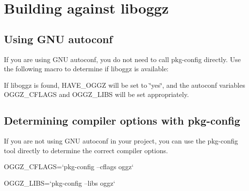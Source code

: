 \section{\-Building against liboggz}
\label{group__building}
\subsection{\-Using G\-N\-U autoconf}\label{group__building_autoconf}
\-If you are using \-G\-N\-U autoconf, you do not need to call pkg-\/config directly. \-Use the following macro to determine if liboggz is available\-:




\-If liboggz is found, \-H\-A\-V\-E\-\_\-\-O\-G\-G\-Z will be set to \char`\"{}yes\char`\"{}, and the autoconf variables \-O\-G\-G\-Z\-\_\-\-C\-F\-L\-A\-G\-S and \-O\-G\-G\-Z\-\_\-\-L\-I\-B\-S will be set appropriately.\subsection{\-Determining compiler options with pkg-\/config}\label{group__building_pkg-config}
\-If you are not using \-G\-N\-U autoconf in your project, you can use the pkg-\/config tool directly to determine the correct compiler options.


\begin{DoxyPre}
 OGGZ\_CFLAGS=`pkg-config --cflags oggz`\end{DoxyPre}



\begin{DoxyPre} OGGZ\_LIBS=`pkg-config --libs oggz`
 \end{DoxyPre}
 